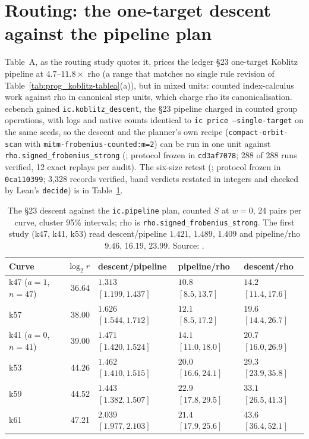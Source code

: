 \section{Routing: the one-target descent against the pipeline plan}\label{sec:kc-routing}

Table~A, as the routing study quotes it, prices the ledger \S23
one-target Koblitz pipeline at $4.7$--$11.8\times$ rho (a range that matches
no single rule revision of Table~\ref{tab:prog_koblitz-tablea}(a)), but in
mixed units: counted index-calculus work
against rho in canonical step units, which charge rho its
canonicalisation. ecbench gained \texttt{ic.koblitz\_descent}, the \S23
pipeline charged in counted group operations, with logs and native counts
identical to \texttt{ic price --single-target} on the same seeds, so the
descent and the planner's own recipe (\texttt{compact-orbit-scan} with
\texttt{mitm-frobenius-counted:m=2}) can be run in one unit against
\texttt{rho.signed\_frobenius\_strong}
(; protocol
frozen in \texttt{cd3af7078}; 288 of 288 runs verified, 12 exact replays per
audit). The six-size retest
(; protocol frozen in
\texttt{0ca110399}; 3{,}328 records verified, band verdicts restated in
integers and checked by Lean's \texttt{decide}) is in
Table~\ref{tab:kc-routing}.

\begin{table}[t]
\centering\small
\begin{tabular}{@{}lrlll@{}}
\toprule
Curve & $\log_2r$ & descent/pipeline & pipeline/rho & descent/rho \\
\midrule
k47 ($a=1$, $n=47$) & 36.64 & $1.313$ $[1.199,1.437]$ & $10.8$ $[8.5,13.7]$ & $14.2$ $[11.4,17.6]$ \\
k57 & 38.00 & $1.626$ $[1.544,1.712]$ & $12.1$ $[8.5,17.2]$ & $19.6$ $[14.4,26.7]$ \\
k41 ($a=0$, $n=41$) & 39.00 & $1.471$ $[1.420,1.524]$ & $14.1$ $[11.0,18.0]$ & $20.7$ $[16.0,26.9]$ \\
k53 & 44.26 & $1.462$ $[1.410,1.515]$ & $20.0$ $[16.6,24.1]$ & $29.3$ $[23.9,35.8]$ \\
k59 & 44.52 & $1.443$ $[1.382,1.507]$ & $22.9$ $[17.8,29.5]$ & $33.1$ $[26.5,41.3]$ \\
k61 & 47.21 & $2.039$ $[1.977,2.103]$ & $21.4$ $[17.9,25.6]$ & $43.6$ $[36.4,52.1]$ \\
\bottomrule
\end{tabular}
\caption[]{The \S23 descent against the \texttt{ic.pipeline} plan, counted
$S$ at $w=0$, 24 pairs per curve, cluster 95\% intervals; rho is
\texttt{rho.signed\_frobenius\_strong}. The first study (k47, k41, k53) read
descent/pipeline $1.421$, $1.489$, $1.409$ and pipeline/rho $9.46$, $16.19$,
$23.99$. Source:
.}
\label{tab:kc-routing}
\end{table}

